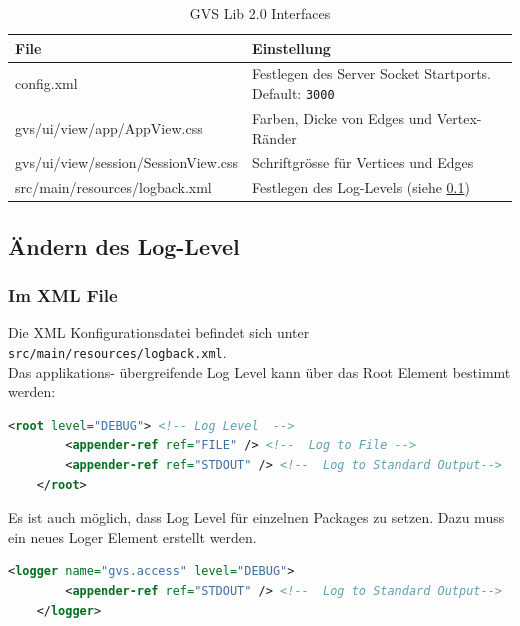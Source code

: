 \documentclass[11pt,a4paper,english,oneside]{book}
\numberwithin{equation}{chapter}
\begin{document}
		\begin{table}[h!]
		\centering
		\begin{tabularx}{\linewidth}{l X}
			\toprule 
			File & Einstellung \\
			\midrule
			config.xml & Festlegen des Server Socket Startports. Default: \lstinline{3000} \\
			gvs/ui/view/app/AppView.css & Farben, Dicke von Edges und Vertex-Ränder \\
			gvs/ui/view/session/SessionView.css & Schriftgrösse für Vertices und Edges\\
			src/main/resources/logback.xml & Festlegen des Log-Levels (siehe \ref{ssec:logger})\\
			\bottomrule 
		\end{tabularx} 
		\caption{GVS Lib 2.0 Interfaces} 
		\label{tbl:preferences}
	\end{table}
	
	\subsection{Ändern des Log-Level} \label{ssec:logger}
	
	\subsubsection{Im XML File}
	Die XML Konfigurationsdatei befindet sich unter \lstinline|src/main/resources/logback.xml|. \\
	Das applikations- übergreifende Log Level kann über das Root Element bestimmt werden:
	
	\begin{lstlisting}[language=xml, frame=single, caption={Root Log Level verändern}, label={lst:root-log-level}]
	<root level="DEBUG"> <!-- Log Level  -->
		<appender-ref ref="FILE" /> <!--  Log to File -->
		<appender-ref ref="STDOUT" /> <!--  Log to Standard Output-->
	</root>
	\end{lstlisting}

	\noindent
	Es ist auch möglich, dass Log Level für einzelnen Packages zu setzen. Dazu muss ein neues Loger Element erstellt werden.
	
	\begin{lstlisting}[language=xml, frame=single, caption={Package Log Level verändern}, label={lst:log-level}]
	<logger name="gvs.access" level="DEBUG">
		<appender-ref ref="STDOUT" /> <!--  Log to Standard Output-->
	</logger>
	\end{lstlisting}	
	
\end{document}
